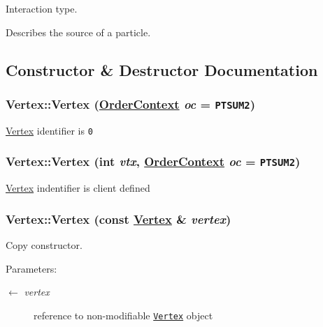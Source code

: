 Interaction type. 

Describes the source of a particle. 

\subsection{Constructor \& Destructor Documentation}
\hypertarget{classVertex_5faf15aab45361a72537f39050df6e52}{
\subsubsection[Vertex]{\setlength{\rightskip}{0pt plus 5cm}Vertex::Vertex (\hyperlink{classVertex_40a06cc3fde98913c8259e3c11cd37ec}{Order\-Context} {\em oc} = {\tt PTSUM2})}}
\label{classVertex_5faf15aab45361a72537f39050df6e52}


\hyperlink{classVertex}{Vertex} identifier is {\tt 0} \hypertarget{classVertex_52ba84694e25fdbc3ee22d461ed7edbd}{
\subsubsection[Vertex]{\setlength{\rightskip}{0pt plus 5cm}Vertex::Vertex (int {\em vtx}, \hyperlink{classVertex_40a06cc3fde98913c8259e3c11cd37ec}{Order\-Context} {\em oc} = {\tt PTSUM2})}}
\label{classVertex_52ba84694e25fdbc3ee22d461ed7edbd}


\hyperlink{classVertex}{Vertex} indentifier is client defined \hypertarget{classVertex_f0cf7fa1f632e6d3a17eda8f29795a08}{
\subsubsection[Vertex]{\setlength{\rightskip}{0pt plus 5cm}Vertex::Vertex (const \hyperlink{classVertex}{Vertex} \& {\em vertex})}}
\label{classVertex_f0cf7fa1f632e6d3a17eda8f29795a08}


Copy constructor. 

\begin{Desc}
\item[Parameters:]
\begin{description}
\item[\mbox{$\leftarrow$} {\em vertex}]reference to non-modifiable {\tt \hyperlink{classVertex}{Vertex}} object \end{description}
\end{Desc}


